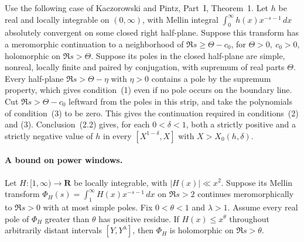 %
Use the following case of Kaczorowski and Pintz, Part~I, Theorem~1.
Let \(h\) be real and locally integrable on \((0,\infty)\), with Mellin integral
\(\int_0^\infty h(x)x^{-s-1}\,dx\) absolutely convergent on some closed
right half-plane. Suppose this transform has a meromorphic continuation
to a neighborhood of \(\Re s\ge\Theta-c_0\), for \(\Theta>0,\ c_0>0\),
holomorphic on \(\Re s>\Theta\). Suppose its poles in the closed
half-plane are simple, nonreal, locally finite and paired by conjugation,
with supremum of real parts \(\Theta\).
Every half-plane \(\Re s>\Theta-\eta\) with \(\eta>0\) contains
a pole by the supremum property, which gives condition~(1) even
if no pole occurs on the boundary line. Cut \(\Re s>\Theta-c_0\)
leftward from the poles in this strip, and take the polynomials of
condition~(3) to be zero. This gives the continuation required in
conditions~(2) and (3). Conclusion~(2.2) gives, for each
\(0<\delta<1\), both a strictly positive and a strictly negative value
of \(h\) in every \([X^{1-\delta},X]\) with \(X>X_0(h,\delta)\).
\cite[Thm.~1 and (2.2)]{z6kaczorowski-pintz}

\paragraph{A bound on power windows.}
%
Let \(H:[1,\infty)\to\mathbf R\) be locally integrable, with
\(|H(x)|\ll x^2\). Suppose its Mellin transform
\(\Phi_H(s)=\int_1^\infty H(x)x^{-s-1}\,dx\) on \(\Re s>2\)
continues meromorphically to \(\Re s>0\) with at most simple poles.
Fix \(0<\theta<1\) and \(\lambda>1\). Assume every real pole of
\(\Phi_H\) greater than \(\theta\) has positive residue.
If \(H(x)\le x^\theta\) throughout arbitrarily distant intervals
\([Y,Y^\lambda]\), then \(\Phi_H\) is holomorphic on \(\Re s>\theta\).

